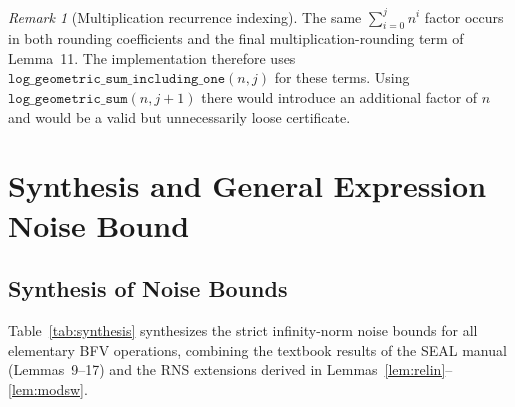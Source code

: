\documentclass[11pt]{article}
\theoremstyle{definition}
\theoremstyle{remark}
\newtheorem{remark}{Remark}
\begin{document}
\begin{remark}[Multiplication recurrence indexing]
The same $\sum_{i=0}^{j}n^i$ factor occurs in both rounding coefficients and
the final multiplication-rounding term of Lemma~11.  The implementation therefore
uses $\texttt{log\_geometric\_sum\_including\_one}(n,j)$ for these terms.
Using $\texttt{log\_geometric\_sum}(n,j+1)$ there would introduce an additional
factor of $n$ and would be a valid but unnecessarily loose certificate.
\end{remark}

\section*{Synthesis and General Expression Noise Bound}

\subsection*{Synthesis of Noise Bounds}

Table~\ref{tab:synthesis} synthesizes the strict infinity-norm noise bounds for all elementary BFV operations, combining the textbook results of the SEAL manual (Lemmas~9--17) and the RNS extensions derived in Lemmas~\ref{lem:relin}--\ref{lem:modsw}.
\end{document}
